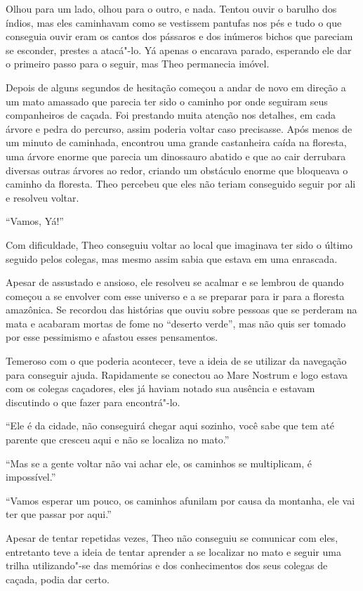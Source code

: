 Olhou para um lado, olhou para o outro, e nada. Tentou ouvir o barulho
dos índios, mas eles caminhavam como se vestissem pantufas nos pés e
tudo o que conseguia ouvir eram os cantos dos pássaros e dos inúmeros
bichos que pareciam se esconder, prestes a atacá"-lo. Yá apenas o
encarava parado, esperando ele dar o primeiro passo para o seguir, mas
Theo permanecia imóvel.

Depois de alguns segundos de hesitação começou a andar de novo em
direção a um mato amassado que parecia ter sido o caminho por onde
seguiram seus companheiros de caçada. Foi prestando muita atenção nos
detalhes, em cada árvore e pedra do percurso, assim poderia voltar caso
precisasse. Após menos de um minuto de caminhada, encontrou uma grande
castanheira caída na floresta, uma árvore enorme que parecia um
dinossauro abatido e que ao cair derrubara diversas outras árvores ao
redor, criando um obstáculo enorme que bloqueava o caminho da floresta.
Theo percebeu que eles não teriam conseguido seguir por ali e resolveu
voltar.

``Vamos, Yá!''

Com dificuldade, Theo conseguiu voltar ao local que imaginava ter sido o
último seguido pelos colegas, mas mesmo assim sabia que estava em uma
enrascada.

Apesar de assustado e ansioso, ele resolveu se acalmar e se lembrou de
quando começou a se envolver com esse universo e a se preparar para ir
para a floresta amazônica. Se recordou das histórias que ouviu sobre
pessoas que se perderam na mata e acabaram mortas de fome no ``deserto
verde'', mas não quis ser tomado por esse pessimismo e afastou esses
pensamentos.

Temeroso com o que poderia acontecer, teve a ideia de se utilizar da
navegação para conseguir ajuda. Rapidamente se conectou ao Mare Nostrum
e logo estava com os colegas caçadores, eles já haviam notado sua
ausência e estavam discutindo o que fazer para encontrá"-lo.

``Ele é da cidade, não conseguirá chegar aqui sozinho, você sabe que tem
até parente que cresceu aqui e não se localiza no mato.''

``Mas se a gente voltar não vai achar ele, os caminhos se multiplicam, é
impossível.''

``Vamos esperar um pouco, os caminhos afunilam por causa da montanha,
ele vai ter que passar por aqui.''

Apesar de tentar repetidas vezes, Theo não conseguiu se comunicar com
eles, entretanto teve a ideia de tentar aprender a se localizar no mato
e seguir uma trilha utilizando"-se das memórias e dos conhecimentos dos
seus colegas de caçada, podia dar certo.


